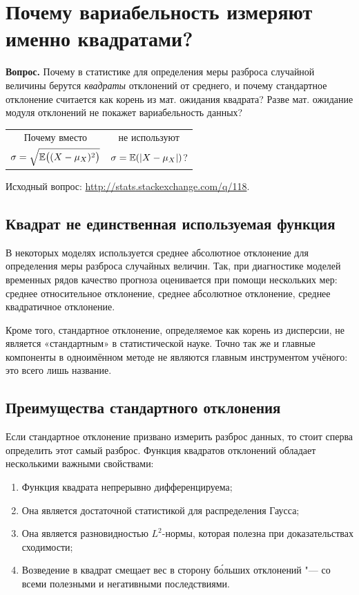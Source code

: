\documentclass[final,pdftex]{../../template/epsilonj}
\begin{document}
\section{Почему вариабельность измеряют именно квадратами?}

\textbf{Вопрос.} Почему в статистике для определения меры разброса случайной величины берутся \textit{квадраты} отклонений от среднего, и почему стандартное отклонение считается как корень из мат. ожидания квадрата? Разве мат. ожидание модуля отклонений не покажет вариабельность данных? 

\begin{center}
	\begin{tabular}{cc}
		\null\quad Почему вместо \quad\null & \null\quad не используют \quad\null \\
		$\sigma = \sqrt{\mathbb{E}\bigl( (X - \mu_X )^2 \bigr)}$ & $\sigma = \mathbb{E}(|X - \mu_X|)$?
	\end{tabular}
\end{center}

Исходный вопрос: \url{http://stats.stackexchange.com/q/118}.

\subsection{Квадрат не единственная используемая функция}

В некоторых моделях используется среднее абсолютное отклонение для определения меры разброса случайных величин. Так, при диагностике моделей временных рядов качество прогноза оценивается при помощи нескольких мер: среднее относительное отклонение, среднее абсолютное отклонение, среднее квадратичное отклонение.

Кроме того, стандартное отклонение, определяемое как корень из дисперсии, не является «стандартным» в статистической науке. Точно так же и главные компоненты в одноимённом методе не являются главным инструментом учёного: это всего лишь название.

\subsection{Преимущества стандартного отклонения}

Если стандартное отклонение призвано измерить разброс данных, то стоит сперва определить этот самый разброс. Функция квадратов отклонений обладает несколькими важными свойствами:
\begin{enumerate}
	\item Функция квадрата непрерывно дифференцируема;
	\item Она является достаточной статистикой для распределения Гаусса;
	\item Она является разновидностью $L^2$-нормы, которая полезна при доказательствах сходимости;
	\item Возведение в квадрат смещает вес в сторону б\'{о}льших отклонений "--- со всеми полезными и негативными последствиями.
\end{enumerate}
\end{document}
